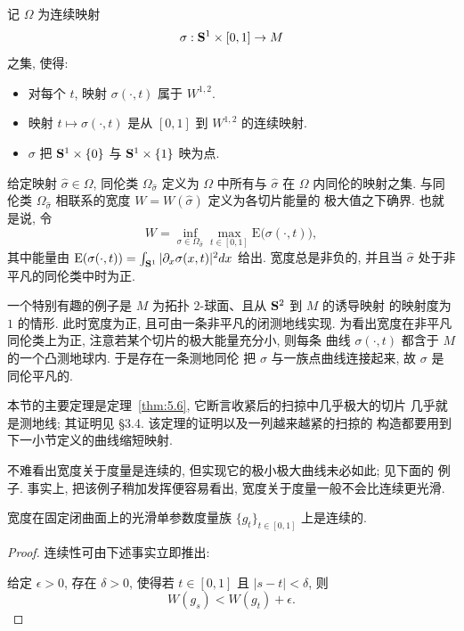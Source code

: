 记 $\Omega$ 为连续映射
\begin{equation*}
\sigma:\mathbf{S}^1\times[0,1]\to M
\end{equation*}
之集, 使得:

\begin{itemize}[leftmargin=1.8em,itemsep=1pt,topsep=2pt]
\item 对每个 $t$, 映射 $\sigma(\cdot,t)$ 属于 $W^{1,2}$.
\item 映射 $t\mapsto\sigma(\cdot,t)$ 是从 $[0,1]$ 到 $W^{1,2}$ 的连续映射.
\item $\sigma$ 把 $\mathbf{S}^1\times\{0\}$ 与 $\mathbf{S}^1\times\{1\}$ 映为点.
\end{itemize}

给定映射 $\hat{\sigma}\in\Omega$, 同伦类 $\Omega_{\hat{\sigma}}$ 定义为 $\Omega$
中所有与 $\hat{\sigma}$ 在 $\Omega$ 内同伦的映射之集. 与同伦类
$\Omega_{\hat{\sigma}}$ 相联系的宽度 $W=W(\hat{\sigma})$ 定义为各切片能量的
极大值之下确界. 也就是说, 令
\begin{equation}
W=\inf_{\sigma\in\Omega_{\hat{\sigma}}}\max_{t\in[0,1]}
\mathrm{E}\bigl(\sigma(\cdot,t)\bigr),
\label{eq:5.23}
\end{equation}
其中能量由 $\mathrm{E}(\sigma(\cdot,t))
=\int_{\mathbf{S}^1}|\partial_x\sigma(x,t)|^2dx$ 给出. 宽度总是非负的, 并且当
$\hat{\sigma}$ 处于非平凡的同伦类中时为正.


一个特别有趣的例子是 $M$ 为拓扑 $2$-球面、且从 $\mathbf{S}^2$ 到 $M$ 的诱导映射
的映射度为 $1$ 的情形. 此时宽度为正, 且可由一条非平凡的闭测地线实现.
为看出宽度在非平凡同伦类上为正, 注意若某个切片的极大能量充分小, 则每条
曲线 $\sigma(\cdot,t)$ 都含于 $M$ 的一个凸测地球内. 于是存在一条测地同伦
把 $\sigma$ 与一族点曲线连接起来, 故 $\sigma$ 是同伦平凡的.

本节的主要定理是定理~\ref{thm:5.6}, 它断言收紧后的扫掠中几乎极大的切片
几乎就是测地线; 其证明见 \S 3.4. 该定理的证明以及一列越来越紧的扫掠的
构造都要用到下一小节定义的曲线缩短映射.

不难看出宽度关于度量是连续的, 但实现它的极小极大曲线未必如此; 见下面的
例子. 事实上, 把该例子稍加发挥便容易看出, 宽度关于度量一般不会比连续更光滑.

\begin{lemma}
\label{lem:5.4}
宽度在固定闭曲面上的光滑单参数度量族 $\{g_t\}_{t\in[0,1]}$ 上是连续的.
\end{lemma}

\begin{proof}
连续性可由下述事实立即推出:

给定 $\epsilon>0$, 存在 $\delta>0$, 使得若 $t\in[0,1]$ 且 $|s-t|<\delta$,
则
\begin{equation*}
W(g_s)<W(g_t)+\epsilon.
\end{equation*}
\end{proof}


